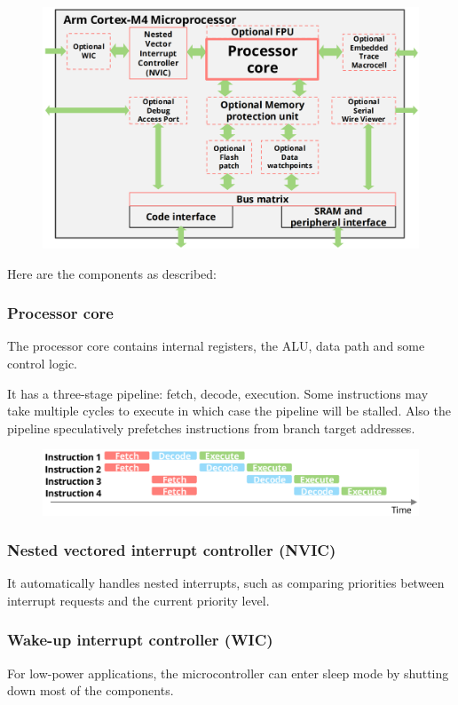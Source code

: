 \begin{figure}[H]
    \centering
    \includegraphics[width=0.8\linewidth]{img/image14.png}
\end{figure}

Here are the components as described:

\subsubsection{Processor core}

The processor core contains internal registers, the ALU, data path and some control logic.

It has a three-stage pipeline: fetch, decode, execution. Some instructions may take multiple cycles to
execute in which case the pipeline will be stalled. Also the pipeline speculatively prefetches instructions
from branch target addresses.

\begin{figure}[H]
    \centering
    \includegraphics[width=0.8\linewidth]{img/image15.png}
\end{figure}

\subsubsection{Nested vectored interrupt controller (NVIC)}
It automatically handles nested interrupts, such as comparing priorities between interrupt requests and
the current priority level.

\subsubsection{Wake-up interrupt controller (WIC)}
For low-power applications, the microcontroller can enter sleep mode by shutting down most of the
components.

